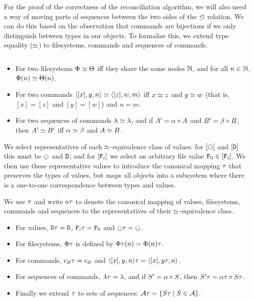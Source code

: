 \bigskip


\noindent
For the proof of the correctness of the reconciliation algorithm,
we will also need a way of moving parts of sequences between the two
sides of the $\trianglelefteq$ relation.
We can do this based on the observation that commands are bijections
if we only distinguish between types in our objects.
To formalise this, we extend type equality ($\simeq$)
to filesystems, commands and sequences of commands.
\begin{mydef}
$ $ %
\begin{itemize}
\item For two filesystems $\Phi\simeq\Theta$ iff they share the same nodes $\mathbb{N}$,
and for all $n\in\mathbb{N}$, $\Phi(n) \simeq \Theta(n)$.
\item For two commands $\langle{[x],y,n}\rangle\simeq\langle{[z],w,m}\rangle$ iff 
$x\simeq z$ and $y\simeq w$
(that is, $[x]=[z]$ and $[y]=[w]$)
and $n=m$.
\item For two sequences of commands $\lambda\simeq\lambda$, and
if $A'=\alpha\circ A$ and $B'=\beta\circ B$, then $A'\simeq B'$ iff $\alpha\simeq\beta$ and $A\simeq B$.
\end{itemize}
\end{mydef}

We select representatives of each $\simeq$-equivalence class of values:
for $[\ominus]$ and $[\mathtt{D}]$ this must be $\ominus$ and $\mathtt{D}$; and
for $[\mathtt{F}_i]$ we select an arbitrary file value $\mathtt{F}_0\in[\mathtt{F}_i]$.
We then use these representative values to
introduce the canonical mapping $\T$ that preserves the types of values,
but maps all objects into a subsystem where there is a one-to-one
correspondence between types and values.

\begin{mydef}[$\T$]\label{def_typemapping}
We use $\T$ and write $a\tau$ to denote the canonical mapping of 
values, filesystems, commands and sequences to the
representatives of their $\simeq$-equivalence class.
\begin{itemize}
\item For values, $\mathtt{D}\tau=\mathtt{D}$, $\mathtt{F}_i\tau=\mathtt{F}_0$ and $\ominus\tau=\ominus$.
\item For filesystems, $\Phi\tau$ is defined by $\Phi\tau(n) = \Phi(n)\tau$.
\item For commands, $c_\varnothing\tau=c_\varnothing$ and $\langle{[x],y,n}\rangle\tau = \langle{[x],{y}\tau,n}\rangle$.
\item For sequences of commands, $\lambda\tau=\lambda$, and if $S'=\alpha\circ S$, then $S'\tau=\alpha\tau\circ S\tau$.
\item Finally we extend $\T$ to sets of sequences: $\mathcal{A}\tau = \{S\tau \mathrel{|} S\in\mathcal{A}\}$.
\end{itemize}
\end{mydef}

